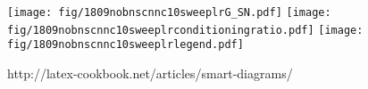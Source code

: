 
\usepackage[colorlinks=True]{hyperref}
\usepackage[T1]{fontenc}
\usepackage[polish]{babel}
\usepackage[utf8]{inputenc}
\usepackage{natbib}
\usepackage{multirow}
\usepackage{placeins}
\usepackage{graphicx}
\usepackage{subfigure}
\usepackage{url}
\usepackage{amsthm}
\usepackage{float}
\usepackage{amsmath}

    \begin{minipage}{.48\textwidth}
    \texttt{[image: fig/1809nobnscnnc10sweeplrG\_SN.pdf]}%
    \texttt{[image: fig/1809nobnscnnc10sweeplrconditioningratio.pdf]}
    \hspace*{0.3cm}
     \texttt{[image: fig/1809nobnscnnc10sweeplrlegend.pdf]}
    \end{minipage}


http://latex-cookbook.net/articles/smart-diagrams/


